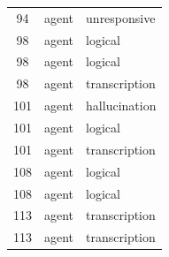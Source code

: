 \begin{tabular}{cll}
94 & agent & unresponsive \\
98 & agent & logical \\
98 & agent & logical \\
98 & agent & transcription \\
101 & agent & hallucination \\
101 & agent & logical \\
101 & agent & transcription \\
108 & agent & logical \\
108 & agent & logical \\
113 & agent & transcription \\
113 & agent & transcription \\
\bottomrule
\end{tabular}